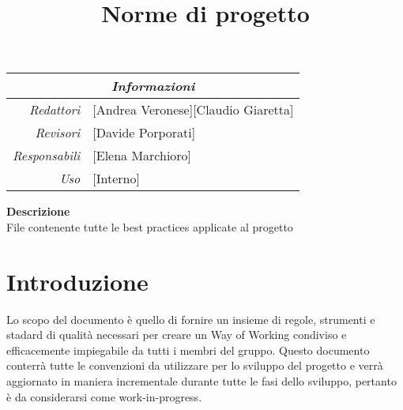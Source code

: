\documentclass[12pt]{article}
\begin{document}
\graphicspath{ {../templates/img/} }
\setcounter{tocdepth}{4}
\setcounter{secnumdepth}{4}
\title{Norme di progetto}

\firstPage

\pagestyle{genericDocstyle}
\maketitle

\begin{center}
    \begin{tabular}{r | l}
		\multicolumn{2}{c}{\textit{Informazioni}}\\
		\hline
		
			\textit{Redattori} &
			[Andrea Veronese][Claudio Giaretta]\makecell{}\\

			\textit{Revisori} &
			[Davide Porporati]\makecell{}\\
			\textit{Responsabili} &
			[Elena Marchioro]\makecell{}\\
		      \textit{Uso} & 
                [Interno]\makecell{}\\
    \end{tabular}
\end{center}

\begin{center}
    \textbf{Descrizione}\\
    File contenente tutte le best practices applicate al progetto 
\end{center}

\pagebreak

\tableofcontents
\pagebreak

\printindex 

\makeversioni
\section{Introduzione}
Lo scopo del documento è quello di fornire un insieme di regole, strumenti e stadard di qualità necessari per creare un Way of Working condiviso e efficacemente impiegabile da tutti i membri del gruppo.
Questo documento conterrà tutte le convenzioni da utilizzare per lo sviluppo del progetto e verrà aggiornato in maniera incrementale durante tutte le fasi dello sviluppo, pertanto è da considerarsi come work-in-progress.
\end{document}
